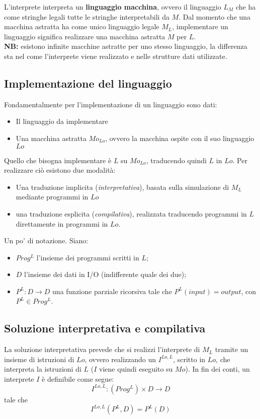 \documentclass[a4paper, 10pt]{article}
\begin{document}
	L'interprete interpreta un \textbf{linguaggio macchina}, ovvero il linguaggio $L_M$ che ha come stringhe legali tutte le stringhe interpretabili da $M$. Dal momento che una macchina astratta ha come unico linguaggio legale $M_L$, implementare un linguaggio significa realizzare una macchina astratta $M$ per $L$.\\
	
	\textbf{NB:} esistono infinite macchine astratte per uno stesso linguaggio, la differenza sta nel come l'interprete viene realizzato e nelle strutture dati utilizzate.
	
	\subsection{Implementazione del linguaggio}
	
	Fondamentalmente per l'implementazione di un linguaggio sono dati:
	\begin{itemize}
		\item Il linguaggio da implementare
		\item Una macchina astratta $Mo_{Lo}$, ovvero la macchina ospite con il suo linguaggio $Lo$
	\end{itemize}
	Quello che bisogna implementare è $L$ su $Mo_{Lo}$, traducendo quindi $L$ in $Lo$. Per realizzare ciò esistono due modalità:
	\begin{itemize}
		\item Una traduzione implicita (\textit{interpretativa}), basata sulla simulazione di $M_L$ mediante programmi in $Lo$
		\item una traduzione esplicita (\textit{compilativa}), realizzata traducendo programmi in $L$ direttamente in programmi in $Lo$.
	\end{itemize}
	
	Un po' di notazione. Siano:
	\begin{itemize}
		\item $Prog^L$ l'insieme dei programmi scritti in $L$;
		\item $D$ l'insieme dei dati in I/O (indifferente quale dei due);
		\item $P^L:D\to D$ una funzione parziale ricorsiva tale che $P^L(input)=output$, con $P^L\in Prog^L$.
	\end{itemize}
	
	\subsection{Soluzione interpretativa e compilativa}
	La soluzione interpretativa prevede che si realizzi l'interprete di $M_L$ tramite un insieme di istruzioni di $Lo$, ovvero realizzando un $I^{Lo,L}$, scritto in $Lo$, che interpreta la istruzioni di $L$ ($I$ viene quindi eseguito su $Mo$).
	In fin dei conti, un interprete $I$ è definibile come segue:
	\[
	I^{Lo,L}:(Prog^L) \times D\to D
	\]
	tale che 
	\[
	I^{Lo,L}(P^L, D)=P^L(D)
	\]
	
\end{document}

